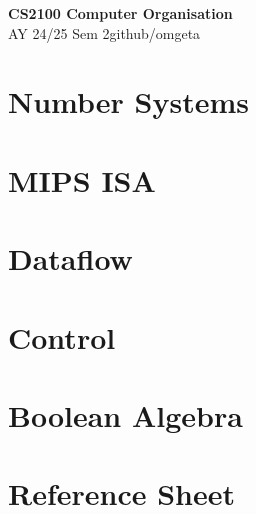 \documentclass[12pt, a4paper]{article}
\newcommand{\mytitle}{CS2100 Computer Organisation}
\newcommand{\myauthor}{github/omgeta}
\newcommand{\mydate}{AY 24/25 Sem 2}
\begin{document}
\raggedright
\footnotesize
\begin{multicols*}{3}
\setlength{\premulticols}{1pt}
\setlength{\postmulticols}{1pt}
\setlength{\multicolsep}{1pt}
\setlength{\columnsep}{2pt}

{\normalsize{\textbf{\mytitle}}} \\
{\footnotesize{\mydate\hspace{2pt}\textemdash\hspace{2pt}\myauthor}}

\section{Number Systems}

\section{MIPS ISA}

\section{Dataflow}

\section{Control}

\section{Boolean Algebra}

\section*{Reference Sheet}


\end{multicols*}
\end{document}
